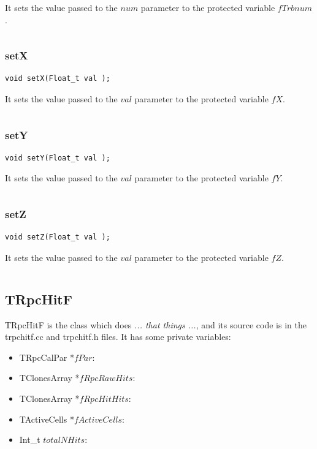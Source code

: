 \documentclass[a4paper]{book}
\begin{document}
It sets the value passed to the $num$ parameter to the protected variable $fTrbnum$.

\[\]

\subsubsection{setX}

\begin{lstlisting}[style=customc]
void setX(Float_t val );
\end{lstlisting}

It sets the value passed to the $val$ parameter to the protected variable $fX$.

\[\]

\subsubsection{setY}

\begin{lstlisting}[style=customc]
void setY(Float_t val );
\end{lstlisting}

It sets the value passed to the $val$ parameter to the protected variable $fY$.

\[\]

\subsubsection{setZ}

\begin{lstlisting}[style=customc]
void setZ(Float_t val );
\end{lstlisting}

It sets the value passed to the $val$ parameter to the protected variable $fZ$.

\[\]

\subsection{TRpcHitF}

TRpcHitF is the class which does \textit{... that things ...}, and its source code is in the trpchitf.cc and trpchitf.h files. It has some private variables:

\begin{itemize}
    \item TRpcCalPar *$fPar$: 
    \item TClonesArray *$fRpcRawHits$: 
    \item TClonesArray *$fRpcHitHits$: 
    \item TActiveCells *$fActiveCells$: 
    \item Int\_t $totalNHits$: 
\end{itemize}
\end{document}
